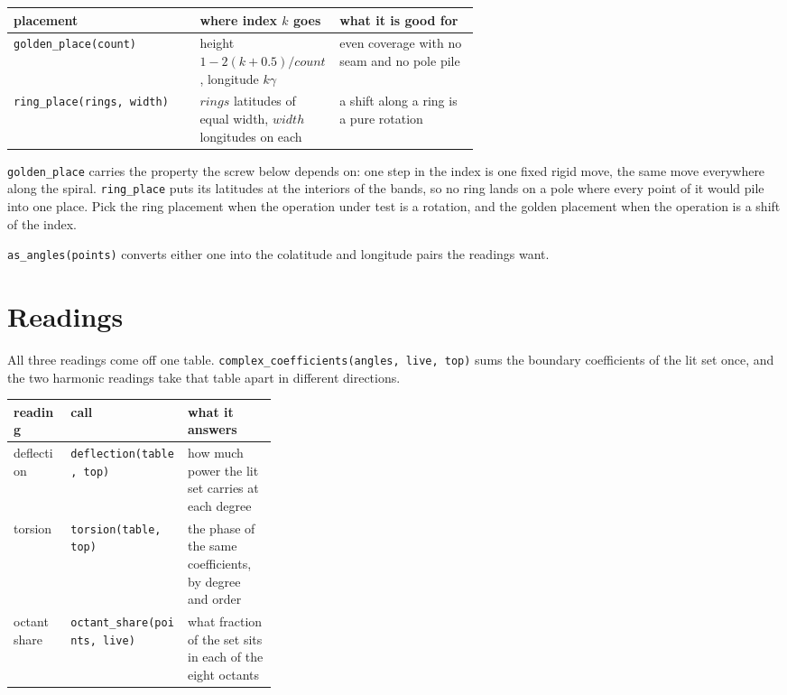 \begin{center}
\begin{tabular}{@{}lp{0.3\linewidth}p{0.3\linewidth}@{}}
\toprule
placement & where index \(k\) goes & what it is good for \\
\midrule
\texttt{golden\_place(count)} & height \(1 - 2(k+0.5)/\mathit{count}\), longitude \(k\gamma\) & even coverage with no seam and no pole pile \\
\texttt{ring\_place(rings, width)} & \(\mathit{rings}\) latitudes of equal width, \(\mathit{width}\) longitudes on each & a shift along a ring is a pure rotation \\
\bottomrule
\end{tabular}
\end{center}

\texttt{golden\_place} carries the property the screw below depends on: one step in the index is one fixed rigid move, the same move everywhere along the spiral. \texttt{ring\_place} puts its latitudes at the interiors of the bands, so no ring lands on a pole where every point of it would pile into one place. Pick the ring placement when the operation under test is a rotation, and the golden placement when the operation is a shift of the index.

\texttt{as\_angles(points)} converts either one into the colatitude and longitude pairs the readings want.

\section{Readings}

All three readings come off one table. \texttt{complex\_coefficients(angles, live, top)} sums the boundary coefficients of the lit set once, and the two harmonic readings take that table apart in different directions.

\begin{center}
\begin{tabular}{@{}llp{0.34\linewidth}@{}}
\toprule
reading & call & what it answers \\
\midrule
deflection & \texttt{deflection(table, top)} & how much power the lit set carries at each degree \\
torsion & \texttt{torsion(table, top)} & the phase of the same coefficients, by degree and order \\
octant share & \texttt{octant\_share(points, live)} & what fraction of the set sits in each of the eight octants \\
\bottomrule
\end{tabular}
\end{center}

